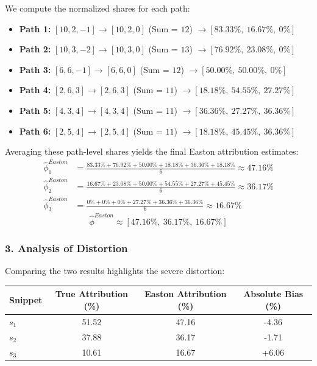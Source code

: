 \documentclass{article}
\begin{document}
We compute the normalized shares for each path:
\begin{itemize}
    \item \textbf{Path 1:} $[10, 2, -1] \to [10, 2, 0]$ (Sum = $12$) $\to [83.33\%, \ 16.67\%, \ 0\%]$
    \item \textbf{Path 2:} $[10, 3, -2] \to [10, 3, 0]$ (Sum = $13$) $\to [76.92\%, \ 23.08\%, \ 0\%]$
    \item \textbf{Path 3:} $[6, 6, -1] \to [6, 6, 0]$ (Sum = $12$) $\to [50.00\%, \ 50.00\%, \ 0\%]$
    \item \textbf{Path 4:} $[2, 6, 3] \to [2, 6, 3]$ (Sum = $11$) $\to [18.18\%, \ 54.55\%, \ 27.27\%]$
    \item \textbf{Path 5:} $[4, 3, 4] \to [4, 3, 4]$ (Sum = $11$) $\to [36.36\%, \ 27.27\%, \ 36.36\%]$
    \item \textbf{Path 6:} $[2, 5, 4] \to [2, 5, 4]$ (Sum = $11$) $\to [18.18\%, \ 45.45\%, \ 36.36\%]$
\end{itemize}

Averaging these path-level shares yields the final Easton attribution estimates:
\begin{align*}
    \hat{\phi}_1^{Easton} &= \frac{83.33\% + 76.92\% + 50.00\% + 18.18\% + 36.36\% + 18.18\%}{6} \approx 47.16\% \\
    \hat{\phi}_2^{Easton} &= \frac{16.67\% + 23.08\% + 50.00\% + 54.55\% + 27.27\% + 45.45\%}{6} \approx 36.17\% \\
    \hat{\phi}_3^{Easton} &= \frac{0\% + 0\% + 0\% + 27.27\% + 36.36\% + 36.36\%}{6} \approx 16.67\%
\end{align*}
$$ \hat{\phi}^{Easton} \approx [47.16\%, \ 36.17\%, \ 16.67\%] $$

\subsubsection{3. Analysis of Distortion}
Comparing the two results highlights the severe distortion:
\begin{table}[h]
\centering
\begin{tabular}{lccc}
\hline
\textbf{Snippet} & \textbf{True Attribution (\%)} & \textbf{Easton Attribution (\%)} & \textbf{Absolute Bias (\%)} \\ \hline
$s_1$            & 51.52                          & 47.16                            & -4.36                       \\
$s_2$            & 37.88                          & 36.17                            & -1.71                       \\
$s_3$            & 10.61                          & 16.67                            & +6.06                       \\ \hline
\end{tabular}
\end{table}
\end{document}
